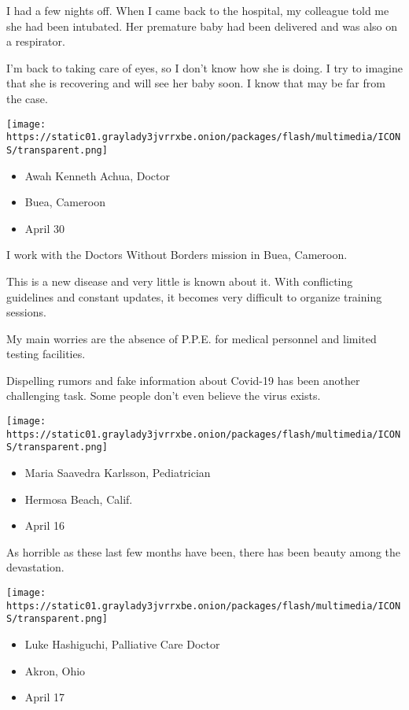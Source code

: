 I had a few nights off. When I came back to the hospital, my colleague
told me she had been intubated. Her premature baby had been delivered
and was also on a respirator.

I'm back to taking care of eyes, so I don't know how she is doing. I try
to imagine that she is recovering and will see her baby soon. I know
that may be far from the case.

\texttt{[image: https://static01.graylady3jvrrxbe.onion/packages/flash/multimedia/ICONS/transparent.png]}

\begin{itemize}
\tightlist
\item
  Awah Kenneth Achua, Doctor
\item
  Buea, Cameroon
\item
  April 30
\end{itemize}

I work with the Doctors Without Borders mission in Buea, Cameroon.

This is a new disease and very little is known about it. With
conflicting guidelines and constant updates, it becomes very difficult
to organize training sessions.

My main worries are the absence of P.P.E. for medical personnel and
limited testing facilities.

Dispelling rumors and fake information about Covid-19 has been another
challenging task. Some people don't even believe the virus exists.

\texttt{[image: https://static01.graylady3jvrrxbe.onion/packages/flash/multimedia/ICONS/transparent.png]}

\begin{itemize}
\tightlist
\item
  Maria Saavedra Karlsson, Pediatrician
\item
  Hermosa Beach, Calif.
\item
  April 16
\end{itemize}

As horrible as these last few months have been, there has been beauty
among the devastation.

\texttt{[image: https://static01.graylady3jvrrxbe.onion/packages/flash/multimedia/ICONS/transparent.png]}

\begin{itemize}
\tightlist
\item
  Luke Hashiguchi, Palliative Care Doctor
\item
  Akron, Ohio
\item
  April 17
\end{itemize}

